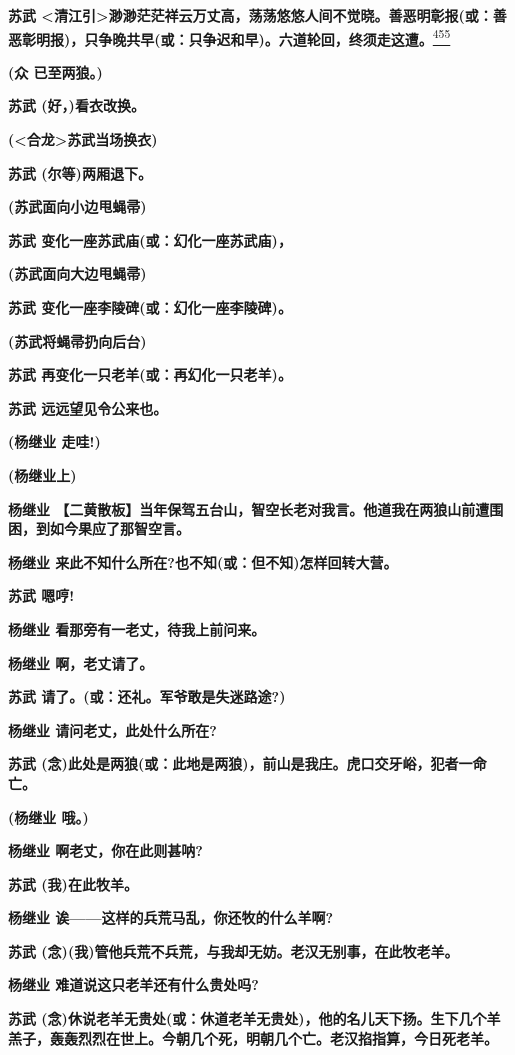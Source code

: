 \textbf{苏武
\textless{}清江引\textgreater{}渺渺茫茫祥云万丈高，荡荡悠悠人间不觉晓。善恶明彰报(或：善恶彰明报)，只争晚共早(或：只争迟和早)。六道轮回，终须走这遭。}\protect\hyperlink{fn455}{\textsuperscript{455}}

\textbf{(众 已至两狼。)}

\textbf{苏武 (好，)看衣改换。}

\textbf{(\textless{}合龙\textgreater{}苏武当场换衣)}

\textbf{苏武 (尔等)两厢退下。}

\textbf{(苏武面向小边甩蝇帚)}

\textbf{苏武 变化一座苏武庙(或：幻化一座苏武庙)，}

\textbf{(苏武面向大边甩蝇帚)}

\textbf{苏武 变化一座李陵碑(或：幻化一座李陵碑)。}

\textbf{(苏武将蝇帚扔向后台)}

\textbf{苏武 再变化一只老羊(或：再幻化一只老羊)。}

\textbf{苏武 远远望见令公来也。}

\textbf{(杨继业 走哇!)}

\textbf{(杨继业上)}

\textbf{杨继业
【二黄散板】当年保驾五台山，智空长老对我言。他道我在两狼山前遭围困，到如今果应了那智空言。}

\textbf{杨继业 来此不知什么所在?也不知(或：但不知)怎样回转大营。}

\textbf{苏武 嗯哼!}

\textbf{杨继业 看那旁有一老丈，待我上前问来。}

\textbf{杨继业 啊，老丈请了。}

\textbf{苏武 请了。(或：还礼。军爷敢是失迷路途?)}

\textbf{杨继业 请问老丈，此处什么所在?}

\textbf{苏武
(念)此处是两狼(或：此地是两狼)，前山是我庄。虎口交牙峪，犯者一命亡。}

\textbf{(杨继业 哦。)}

\textbf{杨继业 啊老丈，你在此则甚呐?}

\textbf{苏武 (我)在此牧羊。}

\textbf{杨继业 诶------这样的兵荒马乱，你还牧的什么羊啊?}

\textbf{苏武
(念)(我)管他兵荒不兵荒，与我却无妨。老汉无别事，在此牧老羊。}

\textbf{杨继业 难道说这只老羊还有什么贵处吗?}

\textbf{苏武
(念)休说老羊无贵处(或：休道老羊无贵处)，他的名儿天下扬。生下几个羊羔子，轰轰烈烈在世上。今朝几个死，明朝几个亡。老汉掐指算，今日死老羊。}

